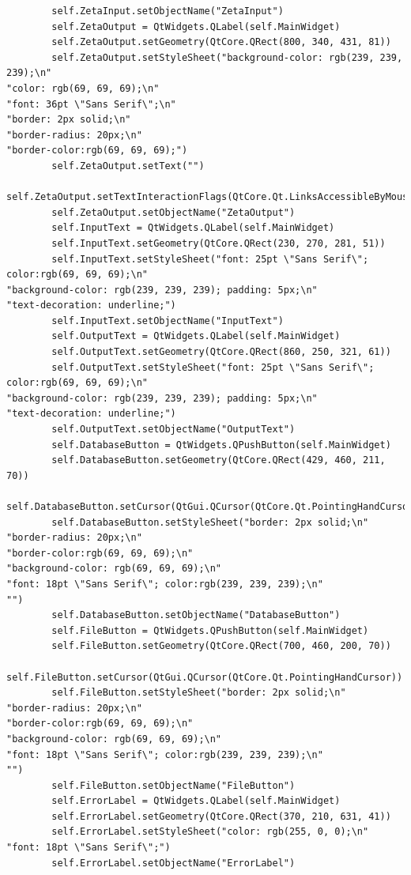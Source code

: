 \documentclass{article}
\begin{document}
\begin{lstlisting}
        self.ZetaInput.setObjectName("ZetaInput")
        self.ZetaOutput = QtWidgets.QLabel(self.MainWidget)
        self.ZetaOutput.setGeometry(QtCore.QRect(800, 340, 431, 81))
        self.ZetaOutput.setStyleSheet("background-color: rgb(239, 239, 239);\n"
"color: rgb(69, 69, 69);\n"
"font: 36pt \"Sans Serif\";\n"
"border: 2px solid;\n"
"border-radius: 20px;\n"
"border-color:rgb(69, 69, 69);")
        self.ZetaOutput.setText("")
        self.ZetaOutput.setTextInteractionFlags(QtCore.Qt.LinksAccessibleByMouse|QtCore.Qt.TextSelectableByKeyboard|QtCore.Qt.TextSelectableByMouse)
        self.ZetaOutput.setObjectName("ZetaOutput")
        self.InputText = QtWidgets.QLabel(self.MainWidget)
        self.InputText.setGeometry(QtCore.QRect(230, 270, 281, 51))
        self.InputText.setStyleSheet("font: 25pt \"Sans Serif\"; color:rgb(69, 69, 69);\n"
"background-color: rgb(239, 239, 239); padding: 5px;\n"
"text-decoration: underline;")
        self.InputText.setObjectName("InputText")
        self.OutputText = QtWidgets.QLabel(self.MainWidget)
        self.OutputText.setGeometry(QtCore.QRect(860, 250, 321, 61))
        self.OutputText.setStyleSheet("font: 25pt \"Sans Serif\"; color:rgb(69, 69, 69);\n"
"background-color: rgb(239, 239, 239); padding: 5px;\n"
"text-decoration: underline;")
        self.OutputText.setObjectName("OutputText")
        self.DatabaseButton = QtWidgets.QPushButton(self.MainWidget)
        self.DatabaseButton.setGeometry(QtCore.QRect(429, 460, 211, 70))
        self.DatabaseButton.setCursor(QtGui.QCursor(QtCore.Qt.PointingHandCursor))
        self.DatabaseButton.setStyleSheet("border: 2px solid;\n"
"border-radius: 20px;\n"
"border-color:rgb(69, 69, 69);\n"
"background-color: rgb(69, 69, 69);\n"
"font: 18pt \"Sans Serif\"; color:rgb(239, 239, 239);\n"
"")
        self.DatabaseButton.setObjectName("DatabaseButton")
        self.FileButton = QtWidgets.QPushButton(self.MainWidget)
        self.FileButton.setGeometry(QtCore.QRect(700, 460, 200, 70))
        self.FileButton.setCursor(QtGui.QCursor(QtCore.Qt.PointingHandCursor))
        self.FileButton.setStyleSheet("border: 2px solid;\n"
"border-radius: 20px;\n"
"border-color:rgb(69, 69, 69);\n"
"background-color: rgb(69, 69, 69);\n"
"font: 18pt \"Sans Serif\"; color:rgb(239, 239, 239);\n"
"")
        self.FileButton.setObjectName("FileButton")
        self.ErrorLabel = QtWidgets.QLabel(self.MainWidget)
        self.ErrorLabel.setGeometry(QtCore.QRect(370, 210, 631, 41))
        self.ErrorLabel.setStyleSheet("color: rgb(255, 0, 0);\n"
"font: 18pt \"Sans Serif\";")
        self.ErrorLabel.setObjectName("ErrorLabel")

\end{lstlisting}
\end{document}
